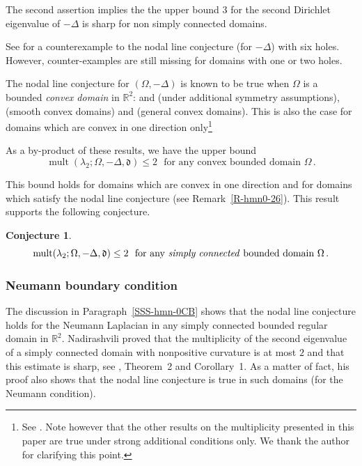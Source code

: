 \documentclass[12pt,a4paper]{amsart}
\theoremstyle{plain} %
\newtheorem{conjecture}[theorem]{Conjecture}
\theoremstyle{definition}
\numberwithin{equation}{section}
\numberwithin{figure}{section}
\numberwithin{table}{section}
\newcommand{\R}{\mathbb{R}}
\newcommand{\mf}{\mathfrak}
\DeclareMathOperator{\mult}{mult}
\begin{document}
{The second assertion implies the the upper bound $3$ for the second Dirichlet eigenvalue of $-\Delta$ is sharp for non simply connected domains.\medskip

See \cite{DaGH2021} for a counterexample to the nodal line conjecture (for $-\Delta$) with six holes. However, counter-examples are still missing for domains with one or two holes.\smallskip

 The nodal line conjecture for $(\Omega,-\Delta)$ is known to be true when $\Omega$ is a bounded \emph{convex domain} in $\R^2$: \cite{Payn1973} and \cite{Lin1987} (under additional symmetry assumptions), \cite{Mela1992} (smooth convex domains) and \cite{Ales1994} (general convex domains).  This is also the case for domains which are convex in one direction only\footnote{See \cite[Corollary~2.7]{Liq1995}. Note however that the other results on the multiplicity presented in this paper are true under strong additional conditions only.  We thank the author for clarifying this point.}\medskip

As a by-product of these results, we have the upper bound
%
\begin{equation*}
\mult(\lambda_2;\Omega,-\Delta,\mf{d}) \le 2 \text{~~for any convex bounded domain~} \Omega\,.
\end{equation*}

This bound holds for domains which are convex in one direction and for domains which satisfy the nodal line conjecture (see Remark~\ref{R-hmn0-26}). This result supports the following conjecture.


\begin{conjecture}\label{C-aaa}
\begin{equation*}
\mult(\lambda_2;\Omega,-\Delta,\mf{d}) \le 2 \text{~~for any \emph{simply connected} bounded domain~} \Omega\,.
\end{equation*}
\end{conjecture}%



\subsubsection{Neumann boundary condition}\label{SSS-hmn-0CN}
The discussion in Paragraph~\ref{SSS-hmn-0CB} shows that the nodal line conjecture holds for the Neumann Laplacian in any simply connected  bounded regular domain in $\R^2$. Nadirashvili proved that the multiplicity of the second eigenvalue of a simply connected domain with nonpositive curvature is at most $2$ and that this estimate is sharp, see \cite{Nadi1987}, Theorem~2 and Corollary~1. As a matter of fact, his proof also shows that the nodal line conjecture is true in such domains (for the Neumann condition).

}
\end{document}
